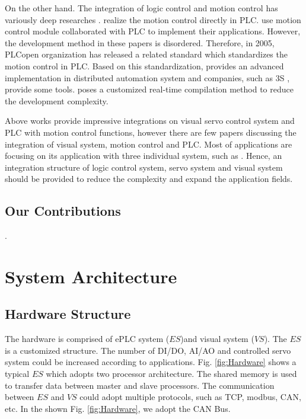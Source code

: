 \documentclass[journal,UTF8]{IEEEtran}
\begin{document}
On the other hand. The integration of logic control and motion control has variously deep researches \cite{Ioannides2004Design,Shi2016The,Fang2017Design, syaichu2011model}. \cite{Ioannides2004Design,syaichu2011model} realize the motion control directly in PLC. \cite{Peng2011Linear, Qian2014A, OMRON2006CS1W} use motion control module collaborated with PLC to implement their applications. However, the development method in these papers is disordered. Therefore, in 2005, PLCopen organization has released a related standard \cite{PLCopen2005Function} which standardizes the motion control in PLC. Based on this standardization, \cite{S2006Advanced} provides an advanced implementation in distributed automation system and companies, such as 3S \cite{3S2017Logic}, provide some tools. \cite{wu2018customized} poses a customized real-time compilation method to reduce the development complexity.

Above works provide impressive integrations on visual servo control system and PLC with motion control functions, however there are few papers discussing the integration of visual system, motion control and PLC. Most of applications are focusing on its application with three individual system, such as \cite{Chen2014A}. Hence, an integration structure of logic control system, servo system and visual system should be provided to reduce the complexity and expand the application fields.

\subsection{Our Contributions}
.
%

\section{System Architecture}
\label{SystemStructure}
\subsection{Hardware Structure}
The hardware is comprised of ePLC system ($ES$)and visual system ($VS$). The $ES$ is a customized structure. The number of DI/DO, AI/AO and controlled servo system could be increased according to applications. Fig. \ref{fig:Hardware} shows a typical $ES$ which adopts two processor architecture. The shared memory is used to transfer data between master and slave processors. The communication between $ES$ and $VS$ could adopt multiple protocols, such as TCP, modbus, CAN, etc. In the shown Fig. \ref{fig:Hardware}, we adopt the CAN Bus.
\end{document}
